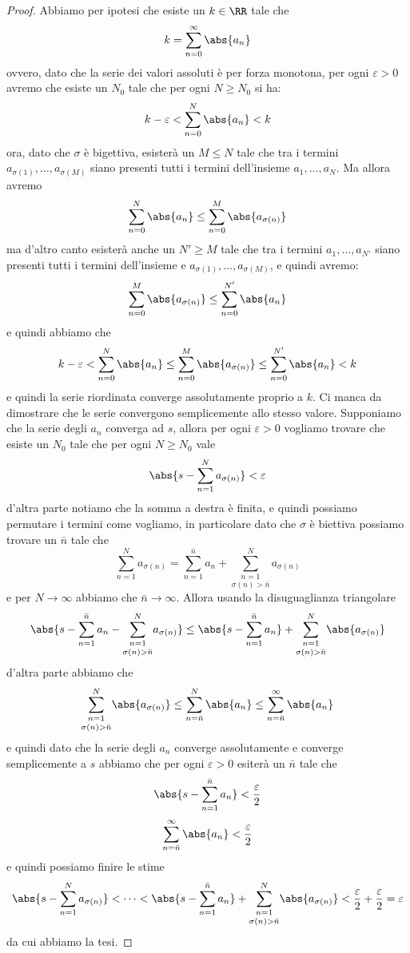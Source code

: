 \documentclass[11pt]{scrartcl}
\begin{document}
	\begin{proof}
		Abbiamo per ipotesi che esiste un $k\in \RR$ tale che 
		$$k=\sum_{n=0}^{\infty}\abs{a_{n}}$$
		ovvero, dato che la serie dei valori assoluti è per forza monotona, per ogni $\varepsilon>0$ avremo che esiste un $N_0$ tale che per ogni $N\ge N_0$ si ha:
		$$k-\varepsilon<\sum_{n=0}^{N}\abs{a_n}<k$$
		ora, dato che $\sigma$ è bigettiva, esisterà un $M\le N$ tale che tra i termini $a_{\sigma(1)},\dots,a_{\sigma(M)}$ siano presenti tutti i termini dell'insieme $a_1,\dots,a_N$. Ma allora avremo
		$$\sum_{n=0}^{N}\abs{a_n}\le \sum_{n=0}^{M}\abs{a_{\sigma(n)}}$$
		ma d'altro canto esisterà anche un $N'\ge M$ tale che tra i termini $a_1,\dots,a_{N'}$ siano presenti tutti i termini dell'insieme e $a_{\sigma(1)},\dots,a_{\sigma(M)}$, e quindi avremo:
		$$\sum_{n=0}^{M}\abs{a_{\sigma(n)}} \le \sum_{n=0}^{N'}\abs{a_n}$$
		e quindi abbiamo che 
		$$k-\varepsilon<\sum_{n=0}^{N}\abs{a_n}\le \sum_{n=0}^{M}\abs{a_{\sigma(n)}}\le \sum_{n=0}^{N'}\abs{a_n} < k$$
		e quindi la serie riordinata converge assolutamente proprio a $k$. Ci manca da dimostrare che le serie convergono semplicemente allo stesso valore. Supponiamo che la serie degli $a_n$ converga ad $s$, allora per ogni $\varepsilon>0$ vogliamo trovare che esiste un $N_0$ tale che per ogni $N\ge N_0$ vale
		$$\abs{s-\sum_{n=1}^{N}a_{\sigma(n)}}<\varepsilon$$
		d'altra parte notiamo che la somma a destra è finita, e quindi possiamo permutare i termini come vogliamo, in particolare dato che $\sigma$ è biettiva possiamo trovare un $\bar{n}$ tale che
		$$\sum_{n=1}^{N}a_{\sigma(n)}=\sum_{n=1}^{\bar{n}}a_n+\underset{\sigma(n)>\bar{n}}{\sum_{n=1}^N}a_{\sigma(n)}$$
		e per $N\to\infty$ abbiamo che $\bar{n}\to\infty$. Allora usando la disuguaglianza triangolare 
		$$\abs{s-\sum_{n=1}^{\bar{n}}a_n-\underset{\sigma(n)>\bar{n}}{\sum_{n=1}^N}a_{\sigma(n)}}\le \abs{s-\sum_{n=1}^{\bar{n}}a_n}+\underset{\sigma(n)>\bar{n}}{\sum_{n=1}^N}\abs{a_{\sigma(n)}}$$
		d'altra parte abbiamo che 
		$$\underset{\sigma(n)>\bar{n}}{\sum_{n=1}^N}\abs{a_{\sigma(n)}}\le \sum_{n=\bar{n}}^{N}\abs{a_n}\le \sum_{n=\bar{n}}^{\infty}\abs{a_n}$$
		e quindi dato che la serie degli $a_n$ converge assolutamente e converge semplicemente a $s$ abbiamo che per ogni $\varepsilon>0$ esiterà un $\bar{n}$ tale che
		$$\abs{s-\sum_{n=1}^{\bar{n}}a_{n}}<\frac{\varepsilon}{2}$$
		$$\sum_{n=\bar{n}}^{\infty}\abs{a_n}<\frac{\varepsilon}{2}$$
		e quindi possiamo finire le stime
		$$\abs{s-\sum_{n=1}^{N}a_{\sigma(n)}}<\dots<\abs{s-\sum_{n=1}^{\bar{n}}a_n}+\underset{\sigma(n)>\bar{n}}{\sum_{n=1}^N}\abs{a_{\sigma(n)}}<\frac{\varepsilon}{2}+\frac{\varepsilon}{2}=\varepsilon$$
		da cui abbiamo la tesi.
	\end{proof}
\end{document}
